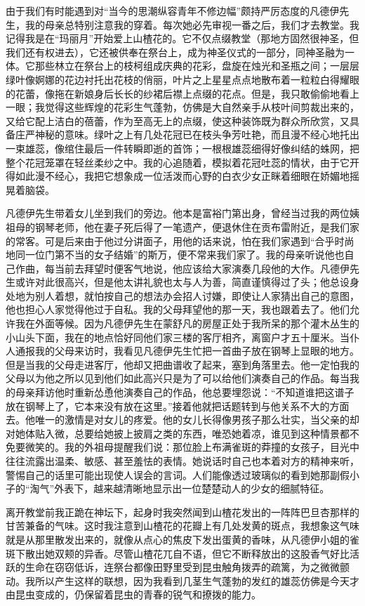 \par 由于我们有时能遇到对“当今的思潮纵容青年不修边幅”颇持严厉态度的凡德伊先生，我的母亲总特别注意我的穿着。每次她必先审视一番之后，我们才去教堂。我记得我是在“玛丽月”开始爱上山楂花的。它不仅点缀教堂（那地方固然很神圣，但我们还有权进去），它还被供奉在祭台上，成为神圣仪式的一部分，同神圣融为一体。它那些林立在祭台上的枝柯组成庆典的花彩，盘旋在烛光和圣瓶之间；一层层绿叶像婀娜的花边衬托出花枝的俏丽，叶片之上星星点点地散布着一粒粒白得耀眼的花蕾，像拖在新娘身后长长的纱裙后襟上点缀的花点。但是，我只敢偷偷地看上一眼；我觉得这些辉煌的花彩生气蓬勃，仿佛是大自然亲手从枝叶间剪裁出来的，又给它配上洁白的蓓蕾，作为至高无上的点缀，使这种装饰既为群众所欣赏，又具备庄严神秘的意味。绿叶之上有几处花冠已在枝头争芳吐艳，而且漫不经心地托出一束雄蕊，像绾住最后一件转瞬即逝的首饰；一根根雄蕊细得好像纠结的蛛网，把整个花冠笼罩在轻丝柔纱之中。我的心追随着，模拟着花冠吐蕊的情状，由于它开得如此漫不经心，我把它想象成一位活泼而心野的白衣少女正眯着细眼在娇媚地摇晃着脑袋。
\par 凡德伊先生带着女儿坐到我们的旁边。他本是富裕门第出身，曾经当过我的两位姨祖母的钢琴老师，他在妻子死后得了一笔遗产，便退休住在贡布雷附近，是我们家的常客。可是后来由于他过分讲面子，用他的话来说，怕在我们家遇到“合乎时尚地同一位门第不当的女子结婚”的斯万，便不常来我们家了。我的母亲听说他也自己作曲，每当前去拜望时便客气地说，他应该给大家演奏几段他的大作。凡德伊先生或许对此很高兴，但是他太讲礼貌也太与人为善，简直谨慎得过了头；他总设身处地为别人着想，就怕按自己的想法办会招人讨嫌，即使让人家猜出自己的意图，他也担心人家觉得他过于自私。我的父母拜望他的那一天，我也跟着去了。他们允许我在外面等候。因为凡德伊先生在蒙舒凡的房屋正处于我所呆的那个灌木丛生的小山头下面，我在的地点恰好同他们家三楼的客厅相齐，离窗户才五十厘米。当仆人通报我的父母来访时，我看见凡德伊先生忙把一首曲子放在钢琴上显眼的地方。但是当我的父母走进客厅，他却又把曲谱收了起来，塞到角落里去。他一定怕我的父母以为他之所以见到他们如此高兴只是为了可以给他们演奏自己的作品。每当我的母亲拜访他时重新怂恿他演奏自己的作品，他总要埋怨说：“不知道谁把这谱子放在钢琴上了，它本来没有放在这里。”接着他就把话题转到与他关系不大的方面去。他唯一的激情是对女儿的疼爱。他的女儿长得像男孩子那么壮实，当父亲的却对她体贴入微，总要给她披上披肩之类的东西，唯恐她着凉，谁见到这种情景都不免要微笑的。我的外祖母提醒我们说：那位脸上布满雀斑的莽撞的女孩子，目光中往往流露出温柔、敏感、甚至羞怯的表情。她说话时自己也本着对方的精神来听，警惕自己的话里可能出现使人误会的言词。人们能像透过玻璃似的看到她那副假小子的“淘气”外表下，越来越清晰地显示出一位楚楚动人的少女的细腻特征。
\par 离开教堂前我正跪在神坛下，起身时我突然闻到山楂花发出的一阵阵巴旦杏那样的甘苦兼备的气味。这时我注意到山楂花的花瓣上有几处发黄的斑点，我想象这气味就是从那里散发出来的，就像从点心的焦皮下发出蛋黄的香味，从凡德伊小姐的雀斑下散出她双颊的异香。尽管山楂花兀自不语，但它不断释放出的这股香气好比活跃的生命在窃窃低诉，连祭台都像田野里受到昆虫触角拨弄的疏篱，为之微微颤动。我所以产生这样的联想，因为我看到几茎生气蓬勃的发红的雄蕊仿佛是今天才由昆虫变成的，仍保留着昆虫的青春的锐气和撩拨的能力。
